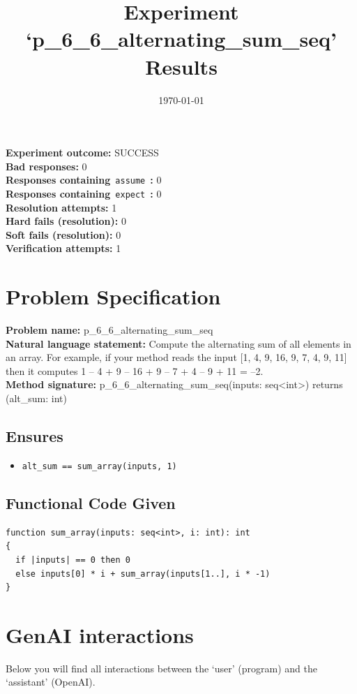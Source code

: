 \documentclass{article}
\begin{document}
\title{Experiment `p\_6\_6\_alternating\_sum\_seq' Results}
\author{\today}
\date{}
\maketitle
\textbf{Experiment outcome: }SUCCESS
\\\textbf{Bad responses: }0
\\\textbf{Responses containing}~\texttt{assume}~\textbf{: }0
\\\textbf{Responses containing}~\texttt{expect}~\textbf{: }0
\\\textbf{Resolution attempts: }1
\\\textbf{Hard fails (resolution): }0
\\\textbf{Soft fails (resolution): }0
\\\textbf{Verification attempts: }1
\section*{Problem Specification}
\textbf{Problem name: }p\_6\_6\_alternating\_sum\_seq
\\\textbf{Natural language statement: }Compute the alternating sum of all elements in an array. For example, if your method reads the input [1, 4, 9, 16, 9, 7, 4, 9, 11] then it computes 1 – 4 + 9 – 16 + 9 – 7 + 4 – 9 + 11 = –2.
\\\textbf{Method signature: }p\_6\_6\_alternating\_sum\_seq(inputs: seq<int>) returns (alt\_sum: int)
\subsection*{Ensures}
\begin{itemize}
\item \texttt{alt\_sum == sum\_array(inputs, 1)}
\end{itemize}
\subsection*{Functional Code Given}
\begin{lstlisting}
function sum_array(inputs: seq<int>, i: int): int
{
  if |inputs| == 0 then 0
  else inputs[0] * i + sum_array(inputs[1..], i * -1)
}
\end{lstlisting}
\clearpage
\section*{GenAI interactions}
Below you will find all interactions between the `user' (program) and the `assistant' (OpenAI).
\end{document}
